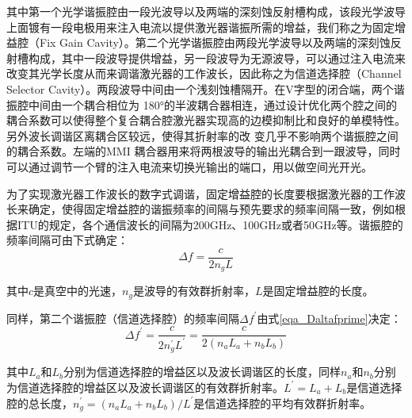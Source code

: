 \documentclass{ZJUthesis}
\begin{document}
其中第一个光学谐振腔由一段光波导以及两端的深刻蚀反射槽构成，该段光学波导上面镀有一段电极用来注入电流以提供激光器谐振所需的增益，我们称之为固定增益腔（Fix Gain Cavity）。第二个光学谐振腔由两段光学波导以及两端的深刻蚀反射槽构成，其中一段波导提供增益，另一段波导为无源波导，可以通过注入电流来改变其光学长度从而来调谐激光器的工作波长，因此称之为信道选择腔（Channel Selector Cavity）。两段波导中间由一个浅刻蚀槽隔开。在V字型的闭合端，两个谐振腔中间由一个耦合相位为 180°的半波耦合器相连，通过设计优化两个腔之间的耦合系数可以使得整个复合耦合腔激光器实现高的边模抑制比和良好的单模特性。另外波长调谐区离耦合区较远，使得其折射率的改
变几乎不影响两个谐振腔之间的耦合系数。左端的MMI 耦合器用来将两根波导的输出光耦合到一跟波导，同时可以通过调节一个臂的注入电流来切换光输出的端口，用以做空间光开光。

为了实现激光器工作波长的数字式调谐，固定增益腔的长度要根据激光器的工作波长来确定，使得固定增益腔的谐振频率的间隔与预先要求的频率间隔一致，例如根据ITU的规定，各个通信波长的间隔为200GHz、100GHz或者50GHz等。谐振腔的频率间隔可由下式确定：
\begin{equation}
  \Delta f = \frac{c}{2 n_g L}
\end{equation}

其中$c$是真空中的光速，$n_g$是波导的有效群折射率，$L$是固定增益腔的长度。

同样，第二个谐振腔（信道选择腔）的频率间隔$\Delta f ^\prime$由式\ref{eqa_Daltafprime}决定：
\begin{equation}\label{eqa_Daltafprime}
  \Delta f ^\prime= \frac{c}{2 n_g^\prime L^\prime} = \frac{c}{2 (n_a L_a + n_b L_b)}
\end{equation}

其中$L_a$和$L_b$分别为信道选择腔的增益区以及波长调谐区的长度，同样$n_a$和$n_b$分别为信道选择腔的增益区以及波长调谐区的有效群折射率。$L^\prime=L_a+L_b$是信道选择腔的总长度，$n_g^\prime=(n_a L_a + n_b L_b)/L^\prime$是信道选择腔的平均有效群折射率。
\end{document}
